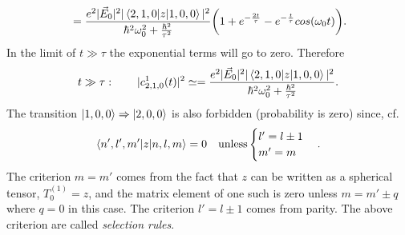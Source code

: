 \begin{example}
\begin{equation}
\begin{split}
			&=\frac{e^2|\vec{E}_0|^2|\braket{2,1,0|z|1,0,0}|^2}{\hbar^2\omega_{0}^2+\frac{\hbar^2}{\tau^2}}\bigg(1+e^{-\frac{2t}{\tau}}-e^{-\frac{t}{\tau}}cos(\omega_0t)\bigg).\\
		\end{split}
	\end{equation} 
	In the limit of $t\gg\tau$ the exponential terms will go to zero. Therefore
	\begin{equation}
		\begin{split}
			t\gg\tau:\qquad|c^1_{2,1,0}(t)|^2\simeq=\frac{e^2|\vec{E}_0|^2|\braket{2,1,0|z|1,0,0}|^2}{\hbar^2\omega_{0}^2+\frac{\hbar^2}{\tau^2}}.\\
		\end{split}
	\end{equation} 
	The transition $\ket{1,0,0}\Rightarrow \ket{2,0,0}$ is also forbidden (probability is zero) since, cf.~\citep[p.322]{Sakurai}
	\begin{equation}
		\braket{n',l',m'|z|n,l,m}=0 \quad \mbox{unless} \begin{cases}
			l'=l\pm1 \\ m'=m
		\end{cases}.
	\end{equation} 
	The criterion $m=m'$ comes from the fact that $z$ can be written as a spherical tensor, $T_{0}^{(1)}=z$, and the matrix element of one such is zero unless $m=m'\pm q$ where $q=0$ in this case. The criterion $l'=l\pm1$ comes from parity. The above criterion are called \emph{selection rules}. 
\end{example}

